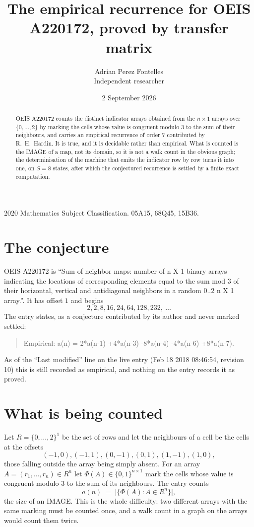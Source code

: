 \documentclass[11pt,a4paper]{article}
\title{The empirical recurrence for OEIS A220172, proved by transfer matrix}
\author{Adrian Perez Fontelles\\ \small Independent researcher}
\date{2 September 2026}
\theoremstyle{plain}
\theoremstyle{definition}
\begin{document}
\maketitle

\begin{abstract}
OEIS A220172 counts the distinct indicator arrays obtained from the $n\times1$ arrays over
$\{0,\dots,2\}$ by marking the cells whose value is congruent modulo 3 to the sum of their neighbours, and carries an
empirical recurrence of order $7$ contributed by R.~H.~Hardin. It is true, and it is
decidable rather than empirical. What is counted is the IMAGE of a map, not its domain, so it
is not a walk count in the obvious graph; the determinisation of the machine that emits the
indicator row by row turns it into one, on $S=8$ states, after which the conjectured
recurrence is settled by a finite exact computation.
\end{abstract}

\noindent\small 2020 Mathematics Subject Classification. 05A15, 68Q45, 15B36.\normalsize

\section{The conjecture}

OEIS A220172 is ``Sum of neighbor maps: number of n X 1 binary arrays indicating the locations of corresponding elements equal to the sum mod 3 of their horizontal, vertical and antidiagonal neighbors in a random 0..2 n X 1 array.''. It has offset $1$ and begins
\[
2, 2, 8, 16, 24, 64, 128, 232,\ \dots
\]
The entry states, as a conjecture contributed by its author and never marked settled:
\begin{quote}
Empirical: a(n) = 2*a(n-1) +4*a(n-3) -8*a(n-4) -4*a(n-6) +8*a(n-7).
\end{quote}
As of the ``Last modified'' line on the live entry (Feb 18 2018 08:46:54, revision 10) this is still
recorded as empirical, and nothing on the entry records it as proved.

\section{What is being counted}

Let $R=\{0,\dots,2\}^{1}$ be the set of rows and let the neighbours of a cell be the
cells at the offsets
\[
(-1,0), (-1,1), (0,-1), (0,1), (1,-1), (1,0),
\]
those falling outside the array being simply absent. For an array
$A=(r_1,\dots,r_n)\in R^n$ let $\Phi(A)\in\{0,1\}^{n\times1}$ mark the cells whose value
is congruent modulo 3 to the sum of its neighbours. The entry counts
\[
a(n)\;=\;\bigl|\{\Phi(A):A\in R^n\}\bigr| ,
\]
the size of an IMAGE. This is the whole difficulty: two different arrays with the same marking
must be counted once, and a walk count in a graph on the arrays would count them twice.
\end{document}
